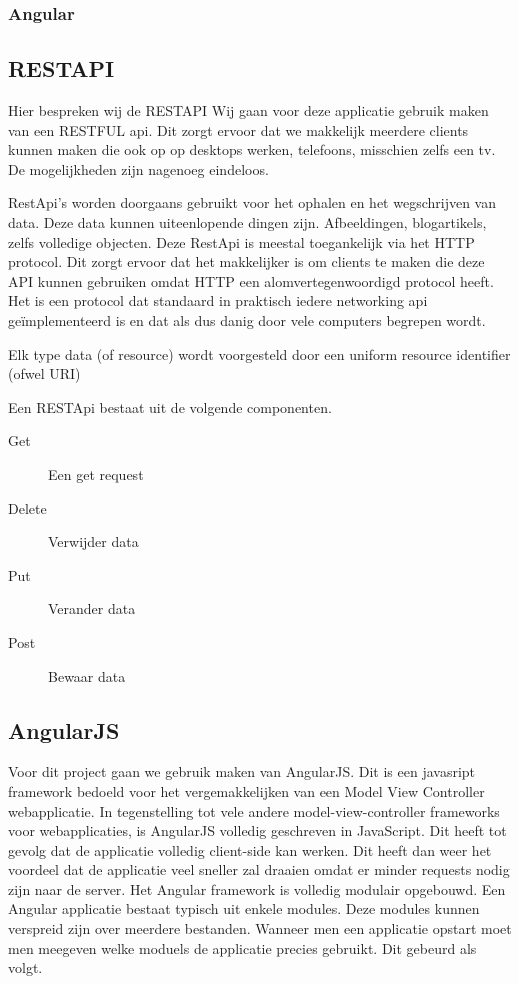 \documentclass[a4paper,11pt]{article}
\begin{document}
\subsubsection{Angular}

\subsection{RESTAPI} %
Hier bespreken wij de RESTAPI
Wij gaan voor deze applicatie gebruik maken van een RESTFUL api. Dit zorgt
ervoor dat we makkelijk meerdere clients kunnen maken die ook op op desktops
werken, telefoons, misschien zelfs een tv. De mogelijkheden zijn nagenoeg
eindeloos.

RestApi's worden doorgaans gebruikt voor het ophalen en het wegschrijven van
data. Deze data kunnen uiteenlopende dingen zijn. Afbeeldingen, blogartikels,
zelfs volledige objecten. Deze RestApi is meestal toegankelijk via het HTTP
protocol. Dit zorgt ervoor dat het makkelijker is om clients te maken die deze
API kunnen gebruiken omdat HTTP een alomvertegenwoordigd protocol heeft. Het is
een protocol dat standaard in praktisch iedere networking api geïmplementeerd is
en dat als dus danig door vele computers begrepen wordt.

Elk type data (of resource) wordt voorgesteld door een uniform resource
identifier (ofwel URI)

Een RESTApi bestaat uit de volgende componenten.
\begin{description}
  \item [Get] Een get request
  \item [Delete] Verwijder data
  \item [Put] Verander data
  \item [Post] Bewaar data
\end{description}

\subsection{AngularJS}
Voor dit project gaan we gebruik maken van AngularJS. Dit is een javasript framework bedoeld voor het vergemakkelijken van een Model View Controller webapplicatie. In tegenstelling tot vele andere model-view-controller frameworks voor webapplicaties, is AngularJS volledig geschreven in JavaScript. Dit heeft tot gevolg dat de applicatie volledig client-side kan werken. Dit heeft dan weer het voordeel dat de applicatie veel sneller zal draaien omdat er minder requests nodig zijn naar de server. Het Angular framework is volledig modulair opgebouwd. Een Angular applicatie bestaat typisch uit enkele modules. Deze modules kunnen verspreid zijn over meerdere bestanden. Wanneer men een applicatie opstart moet men meegeven welke moduels de applicatie precies gebruikt. Dit gebeurd als volgt.
\end{document}
